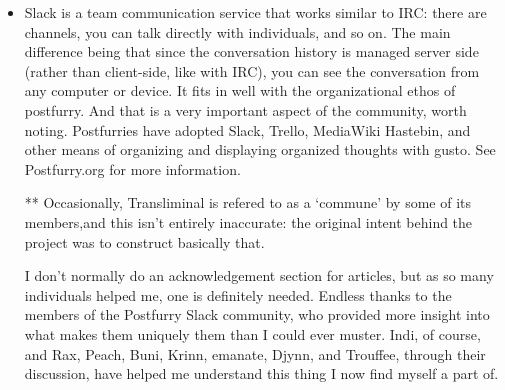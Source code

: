 \begin{itemize}
\tightlist
\item
  Slack is a team communication service that works similar to IRC: there are channels, you can talk directly with individuals, and so on.{ }The main difference being that since the conversation history is managed server side (rather than client-side, like with IRC), you can see the conversation from any computer or device.{ }It fits in well with the organizational ethos of postfurry.{ }And that is a very important aspect of the community, worth noting.{ }Postfurries have adopted Slack, Trello, MediaWiki Hastebin, and other means of organizing and displaying organized thoughts with gusto.{ }See Postfurry.org for more information.

  ** Occasionally, Transliminal is refered to as a `commune' by some of its members,and this isn't entirely inaccurate: the original intent behind the project was to construct basically that.

  I don't normally do an acknowledgement section for articles, but as so many individuals helped me, one is definitely needed.{ }Endless thanks to the members of the Postfurry Slack community, who provided more insight into what makes them uniquely them than I could ever muster.{ Indi}, of course, and Rax, Peach, Buni, Krinn, emanate, Djynn, and Trouffee, through their discussion, have helped me understand this thing I now find myself a part of.
\end{itemize}

